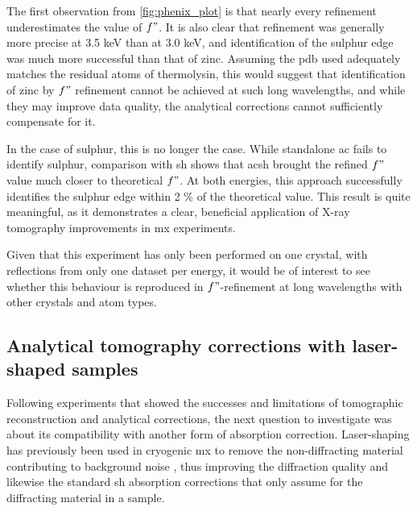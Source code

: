 The first observation from \cref{fig:phenix_plot} is that nearly every refinement underestimates the value of $f"$. It is also clear that refinement was generally more precise at 3.5 \unit{keV} than at 3.0 \unit{keV}, and identification of the sulphur edge was much more successful than that of zinc. Assuming the \ac{pdb} used adequately matches the residual atoms of thermolysin, this would suggest that identification of zinc by $f"$ refinement cannot be achieved at such long wavelengths, and while they may improve data quality, the analytical corrections cannot sufficiently compensate for it. %

In the case of sulphur, this is no longer the case. While standalone \ac{ac} fails to identify sulphur, comparison with \ac{sh} shows that \ac{acsh} brought the refined $f"$ value much closer to theoretical $f"$. At both energies, this approach successfully identifies the sulphur edge within 2 \% of the theoretical value. This result is quite meaningful, as it demonstrates a clear, beneficial application of X-ray tomography improvements in \ac{mx} experiments.%

Given that this experiment has only been performed on one crystal, with reflections from only one dataset per energy, it would be of interest to see whether this behaviour is reproduced in $f"$-refinement at long wavelengths with other crystals and atom types. %

\subsection{Analytical tomography corrections with laser-shaped samples}

Following experiments that showed the successes and limitations of tomographic reconstruction and analytical corrections, the next question to investigate was about its compatibility with another form of absorption correction. Laser-shaping has previously been used in cryogenic \ac{mx} to remove the non-diffracting material contributing to background noise \cite{Basu2019}, thus improving the diffraction quality and likewise the standard \ac{sh} absorption corrections that only assume for the diffracting material in a sample.

